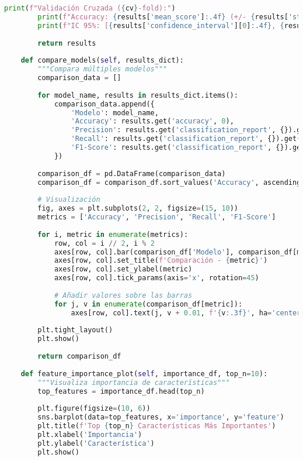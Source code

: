 \begin{lstlisting}[language=Python, caption=Módulo de evaluación de modelos]
        print(f"Validación Cruzada ({cv}-fold):")
        print(f"Accuracy: {results['mean_score']:.4f} (+/- {results['std_score'] * 2:.4f})")
        print(f"IC 95%: [{results['confidence_interval'][0]:.4f}, {results['confidence_interval'][1]:.4f}]")
        
        return results
    
    def compare_models(self, results_dict):
        """Compara múltiples modelos"""
        comparison_data = []
        
        for model_name, results in results_dict.items():
            comparison_data.append({
                'Modelo': model_name,
                'Accuracy': results.get('accuracy', 0),
                'Precision': results.get('classification_report', {}).get('weighted avg', {}).get('precision', 0),
                'Recall': results.get('classification_report', {}).get('weighted avg', {}).get('recall', 0),
                'F1-Score': results.get('classification_report', {}).get('weighted avg', {}).get('f1-score', 0)
            })
        
        comparison_df = pd.DataFrame(comparison_data)
        comparison_df = comparison_df.sort_values('Accuracy', ascending=False)
        
        # Visualización
        fig, axes = plt.subplots(2, 2, figsize=(15, 10))
        metrics = ['Accuracy', 'Precision', 'Recall', 'F1-Score']
        
        for i, metric in enumerate(metrics):
            row, col = i // 2, i % 2
            axes[row, col].bar(comparison_df['Modelo'], comparison_df[metric])
            axes[row, col].set_title(f'Comparación - {metric}')
            axes[row, col].set_ylabel(metric)
            axes[row, col].tick_params(axis='x', rotation=45)
            
            # Añadir valores sobre las barras
            for j, v in enumerate(comparison_df[metric]):
                axes[row, col].text(j, v + 0.01, f'{v:.3f}', ha='center')
        
        plt.tight_layout()
        plt.show()
        
        return comparison_df
    
    def feature_importance_plot(self, importance_df, top_n=10):
        """Visualiza importancia de características"""
        top_features = importance_df.head(top_n)
        
        plt.figure(figsize=(10, 6))
        sns.barplot(data=top_features, x='importance', y='feature')
        plt.title(f'Top {top_n} Características Más Importantes')
        plt.xlabel('Importancia')
        plt.ylabel('Característica')
        plt.show()
        

\end{lstlisting}

